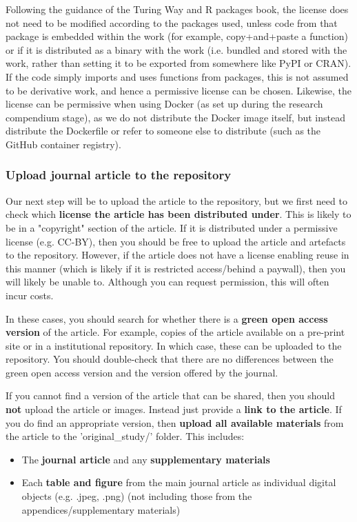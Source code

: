 Following the guidance of the Turing Way\autocite{the_turing_way_community_turing_2022} and R packages book,\autocite{wickham_12_2023} the license does not need to be modified according to the packages used, unless code from that package is embedded within the work (for example, copy+and+paste a function) or if it is distributed as a binary with the work (i.e. bundled and stored with the work, rather than setting it to be exported from somewhere like PyPI or CRAN). If the code simply imports and uses functions from packages, this is not assumed to be derivative work, and hence a permissive license can be chosen. Likewise, the license can be permissive when using Docker (as set up during the research compendium stage), as we do not distribute the Docker image itself, but instead distribute the Dockerfile or refer to someone else to distribute (such as the GitHub container registry).\autocite{the_linux_foundation_docker_nodate}

\vspace{0.5cm}
\subsubsection{Upload journal article to the repository}

Our next step will be to upload the article to the repository, but we first need to check which \textbf{license the article has been distributed under}. This is likely to be in a "copyright" section of the article. If it is distributed under a permissive license (e.g. CC-BY), then you should be free to upload the article and artefacts to the repository. However, if the article does not have a license enabling reuse in this manner (which is likely if it is restricted access/behind a paywall), then you will likely be unable to. Although you can request permission, this will often incur costs.

In these cases, you should search for whether there is a \textbf{green open access version} of the article. For example, copies of the article available on a pre-print site or in a institutional repository. In which case, these can be uploaded to the repository. You should double-check that there are no differences between the green open access version and the version offered by the journal.

If you cannot find a version of the article that can be shared, then you should \textbf{not} upload the article or images. Instead just provide a \textbf{link to the article}. If you do find an appropriate version, then \textbf{upload all available materials} from the article to the 'original\_study/' folder. This includes:
\begin{itemize}
    \item The \textbf{journal article} and any \textbf{supplementary materials}
    \item Each \textbf{table and figure} from the main journal article as individual digital objects (e.g. .jpeg, .png) (not including those from the appendices/supplementary materials)
\end{itemize}

